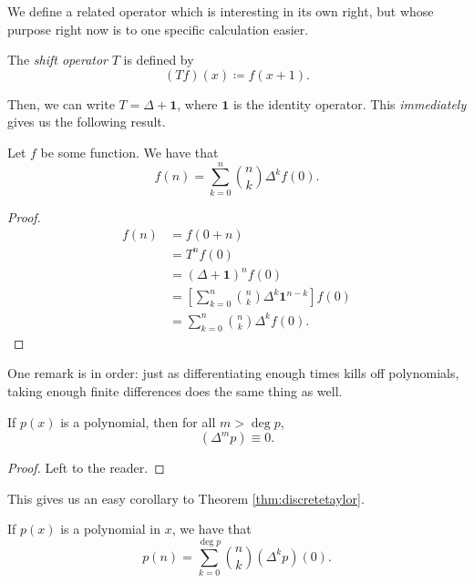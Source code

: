 \documentclass{article}
\DeclareMathOperator{\degree}{deg}
\begin{document}
We define a related operator which is interesting in its own right, but whose purpose right now is to one specific calculation easier.

\begin{definition}
    The \textit{shift operator} $T$ is defined by
    \[
        (Tf)(x) \coloneq f(x+1).
    \]
\end{definition}

Then, we can write $T = \Delta + \mathbf{1}$, where $\mathbf{1}$ is the identity operator.
This \textit{immediately} gives us the following result.

\begin{theorem}\label{thm:discretetaylor}
    Let $f$ be some function.
    We have that
    \[
        f(n) = \sum_{k=0}^n \binom{n}{k} \Delta^k f(0).
    \]
\end{theorem}

\begin{proof}
    \begin{align*}
        f(n) &= f(0+n) \\
             &= T^nf(0) \\
             &= (\Delta + \mathbf{1})^n f(0) \\
             &= \left[\sum_{k=0}^n \binom{n}{k} \Delta^k\mathbf{1}^{n-k}\right] f(0) \\
             &= \sum_{k=0}^n \binom{n}{k} \Delta^k f(0).
    \end{align*}
\end{proof}

One remark is in order: just as differentiating enough times kills off polynomials, taking enough finite differences does the same thing as well.

\begin{remark}
    If $p(x)$ is a polynomial, then for all $m > \degree p$,
    \[
        (\Delta^m p) \equiv 0.
    \]
\end{remark}

\begin{proof}
    Left to the reader.
\end{proof}

This gives us an easy corollary to Theorem \ref{thm:discretetaylor}.

\begin{corollary}\label{cor:polysumfinitediffs}
    If $p(x)$ is a polynomial in $x$, we have that
    \[
        p(n) = \sum_{k=0}^{\degree p}\binom{n}{k}(\Delta^kp)(0).
    \]
\end{corollary}
\end{document}
